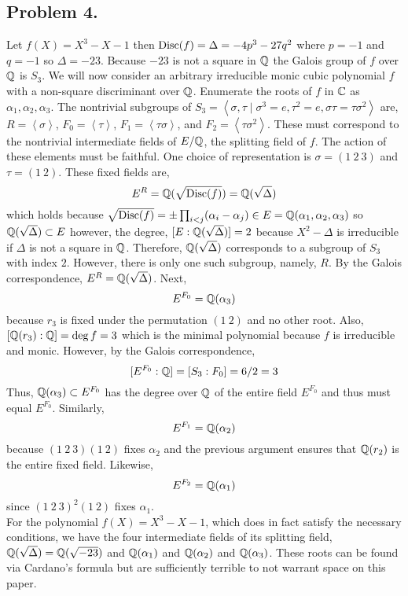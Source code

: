 \documentclass[12pt]{extarticle}
\begin{document}
\subsection*{Problem 4.}
Let $f(X) = X^3 - X - 1$ then $\mathrm{Disc}(f) = \Delta = - 4 p^3 - 27 q^2$ where $p = -1$ and $q = -1$ so $\Delta = -23$. Because $-23$ is not a square in $\mathbb{Q}$ the Galois group of $f$ over $\mathbb{Q}$ is $S_3$. We will now consider an arbitrary irreducible monic cubic polynomial $f$ with a non-square discriminant over $\mathbb{Q}$. Enumerate the roots of $f$ in $\mathbb{C}$ as $\alpha_1, \alpha_2, \alpha_3$. The nontrivial subgroups of $S_3 = \left< \sigma, \tau \mid \sigma^3 = e, \tau^2 = e, \sigma \tau = \tau \sigma^2 \right>$ are, $R = \left< \sigma \right>$, $F_0 = \left< \tau \right>$, $F_1 = \left< \tau \sigma \right>$, and $F_2 = \left< \tau \sigma^2 \right>$. These must correspond to the nontrivial intermediate fields of $E/\mathbb{Q}$, the splitting field of $f$. The action of these elements must be faithful. One choice of representation is $\sigma = (1 \: 2 \: 3)$ and $\tau = (1 \: 2)$. These fixed fields are, 
\[E^{R} = \mathbb{Q}(\sqrt{\mathrm{Disc}(f)}) = \mathbb{Q}(\sqrt{\Delta}) \] 
which holds because $\sqrt{\mathrm{Disc}(f)} = \pm \prod_{i < j} (\alpha_i - \alpha_j) \in E = \mathbb{Q}(\alpha_1, \alpha_2, \alpha_3)$ so $\mathbb{Q}(\sqrt{\Delta}) \subset E$ however, the degree, $[E : \mathbb{Q}(\sqrt{\Delta})] = 2$ because $X^2 - \Delta$ is irreducible if $\Delta$ is not a square in $\mathbb{Q}$. Therefore, $\mathbb{Q}(\sqrt{\Delta})$ corresponds to a subgroup of $S_3$ with index $2$. However, there is only one such subgroup, namely, $R$. By the Galois correspondence, $E^R = \mathbb{Q}(\sqrt{\Delta})$. Next,  
\[E^{F_0} = \mathbb{Q}(\alpha_3)\] 
because $r_3$ is fixed under the permutation $(1 \: 2)$ and no other root. Also, $[\mathbb{Q}(r_3) : \mathbb{Q}] = \deg f = 3$ which is the minimal polynomial because $f$ is irreducible and monic. However, by the Galois correspondence, 
\[[E^{F_0} : \mathbb{Q}] = [S_3 : F_0] = 6/2 = 3\]
Thus, $\mathbb{Q}(\alpha_3) \subset E^{F_0}$ has the degree over $\mathbb{Q}$ of the entire field $E^{F_0}$ and thus must equal $E^{F_0}$. Similarly,
\[E^{F_1} = \mathbb{Q}(\alpha_2)\]   
because $(1 \: 2 \: 3) (1 \: 2)$ fixes $\alpha_2$ and the previous argument ensures that $\mathbb{Q}(r_2)$ is the entire fixed field. Likewise,
\[E^{F_2} = \mathbb{Q}(\alpha_1)\]   
since $(1 \: 2 \: 3)^2 (1 \: 2)$ fixes $\alpha_1$. \bigskip\\
For the polynomial $f(X) = X^3 - X - 1$, which does in fact satisfy the necessary conditions, we have the four intermediate fields of its splitting field, $\mathbb{Q}(\sqrt{\Delta}) = \mathbb{Q}(\sqrt{-23})$ and $\mathbb{Q}(\alpha_1)$ and $\mathbb{Q}(\alpha_2)$ and $\mathbb{Q}(\alpha_3)$. These roots can be found via Cardano’s formula but are sufficiently terrible to not warrant space on this paper.  
\end{document}
